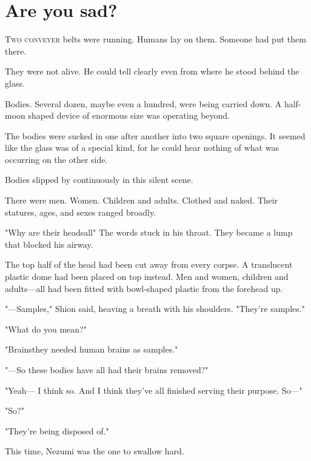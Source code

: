 
\chapter{Are you sad?}


\lettrine{T}{wo conveyer} belts were running. Humans lay on them. Someone had put
them there.

They were not alive. He could tell clearly even from where he stood
behind the glass.

Bodies. Several dozen, maybe even a hundred, were being carried down. A
half-moon shaped device of enormous size was operating beyond.

The bodies were sucked in one after another into two square openings. It
seemed like the glass was of a special kind, for he could hear nothing
of what was occurring on the other side.

Bodies slipped by continuously in this silent scene.

There were men. Women. Children and adults. Clothed and naked. Their
statures, ages, and sexes ranged broadly.

"Why are their heads\el all\el " The words stuck in his throat. They
became a lump that blocked his airway.

The top half of the head had been cut away from every corpse. A
translucent plastic dome had been placed on top instead. Men and women,
children and adults---all had been fitted with bowl-shaped plastic from
the forehead up.

"---Samples," Shion said, heaving a breath with his shoulders. "They're
samples."

"What do you mean?"

"Brains\el they needed human brains as samples."

"---So these bodies have all had their brains removed?"

"Yeah--- I think so. And I think they've all finished serving their
purpose. So---"

"So?"

"They're being disposed of."

This time, Nezumi was the one to swallow hard.


